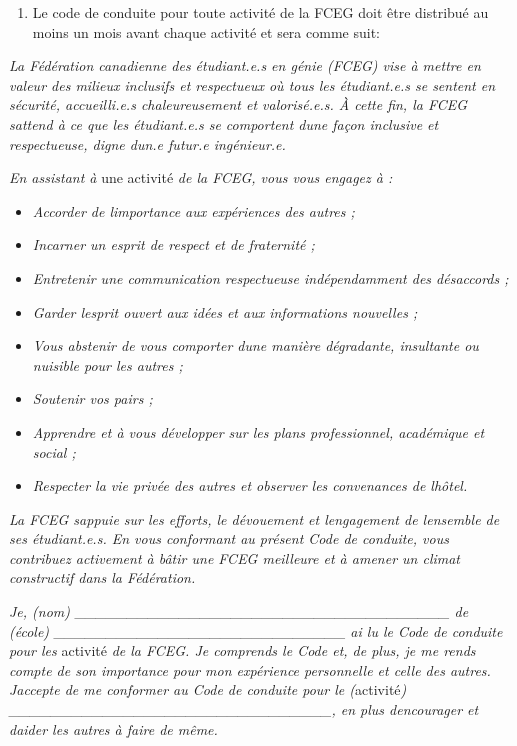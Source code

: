 \begin{enumerate}
 \item
  Le code de conduite pour toute activité de la FCEG doit être distribué au moins un mois avant chaque activité et sera comme suit:
\end{enumerate}

\emph{La Fédération canadienne des étudiant.e.s en génie (FCEG) vise à mettre en valeur des milieux inclusifs et respectueux où tous les étudiant.e.s se sentent en sécurité, accueilli.e.s chaleureusement et valorisé.e.s. À cette fin, la FCEG s\textquotesingle attend à ce que les étudiant.e.s se comportent d\textquotesingle une façon inclusive et respectueuse, digne d\textquotesingle un.e futur.e ingénieur.e.}

\emph{En assistant à} une activité \emph{de la FCEG, vous vous engagez à :}

\begin{itemize}
 \item
  \emph{Accorder de l\textquotesingle importance aux expériences des autres ;}
 \item
  \emph{Incarner un esprit de respect et de fraternité ;}
 \item
  \emph{Entretenir une communication respectueuse indépendamment des désaccords ;}
 \item
  \emph{Garder l\textquotesingle esprit ouvert aux idées et aux informations nouvelles ;}
 \item
  \emph{Vous abstenir de vous comporter d\textquotesingle une manière dégradante, insultante ou nuisible pour les autres ;}
 \item
  \emph{Soutenir vos pairs ;}
 \item
  \emph{Apprendre et à vous développer sur les plans professionnel, académique et social ;}
 \item
  \emph{Respecter la vie privée des autres et observer les convenances de l\textquotesingle hôtel.}
\end{itemize}

\emph{La FCEG s\textquotesingle appuie sur les efforts, le dévouement et l\textquotesingle engagement de l\textquotesingle ensemble de ses étudiant.e.s. En vous conformant au présent Code de conduite, vous contribuez activement à bâtir une FCEG meilleure et à amener un climat constructif dans la Fédération.}

\emph{Je, (nom) \_\_\_\_\_\_\_\_\_\_\_\_\_\_\_\_\_\_\_\_\_\_\_\_\_\_\_\_\_\_\_\_\_\_\_\_ de (école) \_\_\_\_\_\_\_\_\_\_\_\_\_\_\_\_\_\_\_\_\_\_\_\_\_\_\_\_ ai lu le Code de conduite pour les} activité \emph{de la FCEG. Je comprends le Code et, de plus, je me rends compte de son importance pour mon expérience personnelle et celle des autres. J\textquotesingle accepte de me conformer au Code de conduite pour le (}activité\emph{) \_\_\_\_\_\_\_\_\_\_\_\_\_\_\_\_\_\_\_\_\_\_\_\_\_\_\_\_\_\_\_, en plus d\textquotesingle encourager et d\textquotesingle aider les autres à faire de même.}

